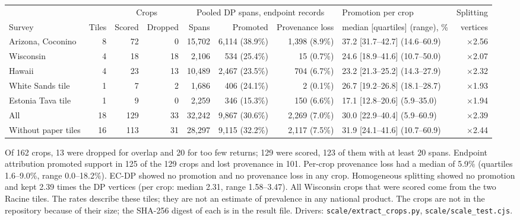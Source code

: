 \documentclass[11pt]{article}
\begin{document}
\begin{center}\scriptsize
\begin{tabular}{@{}lrrrrrrlr@{}}
\toprule
 & & \multicolumn{2}{c}{Crops} & \multicolumn{3}{c}{Pooled DP spans, endpoint records} & Promotion per crop & Splitting \\
\cmidrule(lr){3-4}\cmidrule(lr){5-7}
Survey & Tiles & Scored & Dropped & Spans & Promoted & Provenance loss & median [quartiles] (range), \% & vertices \\
\midrule
Arizona, Coconino & 8 & 72 & 0 & 15,702 & 6,114 (38.9\%) & 1,398 (8.9\%) & 37.2 [31.7--42.7] (14.6--60.9) & $\times$2.56 \\
Wisconsin & 4 & 18 & 18 & 2,106 & 534 (25.4\%) & 15 (0.7\%) & 24.6 [18.9--41.6] (10.7--50.0) & $\times$2.07 \\
Hawaii & 4 & 23 & 13 & 10,489 & 2,467 (23.5\%) & 704 (6.7\%) & 23.2 [21.3--25.2] (14.3--27.9) & $\times$2.32 \\
White Sands tile & 1 & 7 & 2 & 1,686 & 406 (24.1\%) & 2 (0.1\%) & 26.7 [19.2--26.8] (18.1--28.7) & $\times$1.93 \\
Estonia Tava tile & 1 & 9 & 0 & 2,259 & 346 (15.3\%) & 150 (6.6\%) & 17.1 [12.8--20.6] (5.9--35.0) & $\times$1.94 \\
\midrule
All & 18 & 129 & 33 & 32,242 & 9,867 (30.6\%) & 2,269 (7.0\%) & 30.0 [22.9--40.4] (5.9--60.9) & $\times$2.39 \\
Without paper tiles & 16 & 113 & 31 & 28,297 & 9,115 (32.2\%) & 2,117 (7.5\%) & 31.9 [24.1--41.6] (10.7--60.9) & $\times$2.44 \\
\bottomrule
\end{tabular}
\end{center}

\noindent Of 162 crops, 13 were dropped for overlap and 20 for too few returns; 129 were scored, 123 of them with at least 20 spans. Endpoint attribution promoted support in 125 of the 129 crops and lost provenance in 101. Per-crop provenance loss had a median of 5.9\% (quartiles 1.6--9.0\%, range 0.0--18.2\%). EC-DP showed no promotion and no provenance loss in any crop. Homogeneous splitting showed no promotion and kept 2.39 times the DP vertices (per crop: median 2.31, range 1.58--3.47). All Wisconsin crops that were scored come from the two Racine tiles. The rates describe these tiles; they are not an estimate of prevalence in any national product. The crops are not in the repository because of their size; the SHA-256 digest of each is in the result file. Drivers: \texttt{scale/extract\_crops.py}, \texttt{scale/scale\_test.cjs}.
\end{document}
